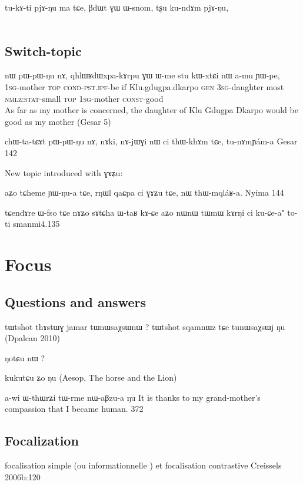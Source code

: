 \documentclass[oldfontcommands,oneside,a4paper,11pt]{memoir}
\newcommand{\ipa}[1]{{\phon #1}} %
\newcommand{\cond}{\textsc{cond}}
\newcommand{\const}{\textsc{const}}
\newcommand{\gen}{\textsc{gen}}
\newcommand{\ipf}{\textsc{ipf}}
\newcommand{\nmlz}{\textsc{nmlz}}
\newcommand{\pst}{\textsc{pst}}
\newcommand{\sg}{\textsc{sg}}
\newcommand{\stat}{\textsc{stat}}
\newcommand{\topic}{\textsc{top}}
\begin{document}
\begin{exe}	
\ex								
\gll 	\ipa{astaʁɬamu}	\ipa{tu-kɤ-ti}	\ipa{pjɤ-ŋu}	\ipa{ma}	\ipa{tɕe,}	\ipa{βdɯt}	\ipa{ɣɯ}	\ipa{ɯ-snom,}	\ipa{tʂu}	\ipa{ku-ndɤm}	\ipa{pjɤ-ŋu,}
 \\
  \\
 \glt 	 
\end{exe} 

\subsection{Switch-topic}

\begin{exe}	
\ex	
\gll \ipa{a-mu} 	\ipa{nɯ} 	\ipa{pɯ-pɯ-ŋu} 	\ipa{nɤ,} 	\ipa{qhlɯʁdɯxpa-kɤrpu} 	\ipa{ɣɯ} 	\ipa{ɯ-me} 	\ipa{stu} 	\ipa{kɯ-xtɕi} 	\ipa{nɯ} 	\ipa{a-mu} 	\ipa{ɲɯ-pe,} \\
1\sg{}-mother \topic{} \cond{}-\pst{}.\ipf{}-be if Klu.gdugpa.dkarpo \gen{} 3\sg{}-daughter most \nmlz{}:\stat{}-small \topic{} 1\sg{}-mother \const{}-good \\
 \glt 	 As far as my mother is concerned, the daughter of Klu Gdugpa Dkarpo would be good as my mother (Gesar 5)
\end{exe} 	


chɯ-ta-tɕɤt	pɯ-pɯ-ŋu	nɤ,	nɤki,	nɤ-jɯɣi	nɯ	ci	thɯ-khɤm	tɕe,	tu-nɤmɲám-a
Gesar 142

New topic introduced with \ipa{ɣɤʑu}:

aʑo	tɕheme	ɲɯ-ŋu-a	tɕe,	rŋɯl	qaɕpa	ci	ɣɤʑu	tɕe,	nɯ	thɯ-mqláʁ-a.
Nyima 144


tɕendɤre ɯ-fso tɕe nɤʑo sɤtɕha ɯ-taʁ kɤ-ɕe 
aʑo nɯnɯ tɯmɯ kɤrŋi ci ku-ɕe-a" to-ti
smanmi4.135
\section{Focus}

\subsection{Questions and answers}
tɯtshot thɤstɯɣ jamar tɯnɯsaχsɯnɯ ?
tɯtshot sqamnɯz tɕe tunɯsaχsɯj ŋu
(Dpalcan 2010)

ŋotɕu nɯ ?

kukutɕu ʑo ŋu
(Aesop, The horse and the Lion)
 
a-wi	ɯ-thɯrʑi	tɯ-rme	nɯ-aβzu-a	ŋu
It is thanks to my grand-mother's compassion that I became human.
372

\subsection{Focalization}
focalisation simple (ou informationnelle ) et focalisation contrastive
Creissels 2006b:120
\end{document}
